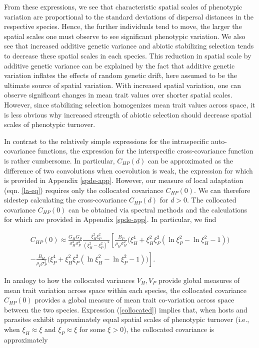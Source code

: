 \documentclass{article}
\begin{document}
From these expressions, we see that characteristic spatial scales of
phenotypic variation are proportional to the standard deviations of
dispersal distances in the respective species. Hence, the further
individuals tend to move, the larger the spatial scales one must observe
to see significant phenotypic variation. We also see that increased
additive genetic variance and abiotic stabilizing selection tends to
decrease these spatial scales in each species. This reduction in spatial
scale by additive genetic variance can be explained by the fact that
additive genetic variation inflates the effects of random genetic drift,
here assumed to be the ultimate source of spatial variation. With
increased spatial variation, one can observe significant changes in mean
trait values over shorter spatial scales. However, since stabilizing
selection homogenizes mean trait values across space, it is less obvious
why increased strength of abiotic selection should decrease spatial
scales of phenotypic turnover.

In contrast to the relatively simple expressions for the intraspecific
auto-covariance functions, the expression for the interspecific
cross-covariance function is rather cumbersome. In particular,
\(C_{HP}(d)\) can be approximated as the difference of two convolutions
when coevolution is weak, the expression for which is provided in
Appendix \ref{spde-app}. However, our measure of local adaptation (eqn.
\ref{la-eq}) requires only the collocated covariance \(C_{HP}(0)\). We
can therefore sidestep calculating the cross-covariance \(C_{HP}(d)\)
for \(d>0\). The collocated covariance \(C_{HP}(0)\) can be obtained via
spectral methods and the calculations for which are provided in Appendix
\ref{spde-app}. In particular, we find

\begin{multline}\label{collocated}
  C_{HP}(0)\approx \frac{G_HG_P}{\sigma_H^2\sigma_P^2}\frac{\xi_H^2\xi_P^2}{(\xi_H^2-\xi_P^2)^2}\left[\frac{B_P}{\rho_H\sigma_H^2}\Big(\xi_H^4+\xi_H^2\xi_P^2(\ln\xi_P^2-\ln\xi_H^2-1)\Big)\right. \\
  \left.-\frac{B_H}{\rho_P\sigma_P^2}\Big(\xi_P^4+\xi_H^2\xi_P^2(\ln\xi_H^2-\ln\xi_P^2-1)\Big)\right].
\end{multline}

In analogy to how the collocated variances \(V_H,V_P\) provide global
measures of mean trait variation across space within each species, the
collocated covariance \(C_{HP}(0)\) provides a global measure of mean
trait co-variation across space between the two species. Expression
(\ref{collocated}) implies that, when hosts and parasites exhibit
approximately equal spatial scales of phenotypic turnover (i.e., when
\(\xi_H\approx\xi\) and \(\xi_P\approx\xi\) for some \(\xi>0\)), the
collocated covariance is approximately
\end{document}
